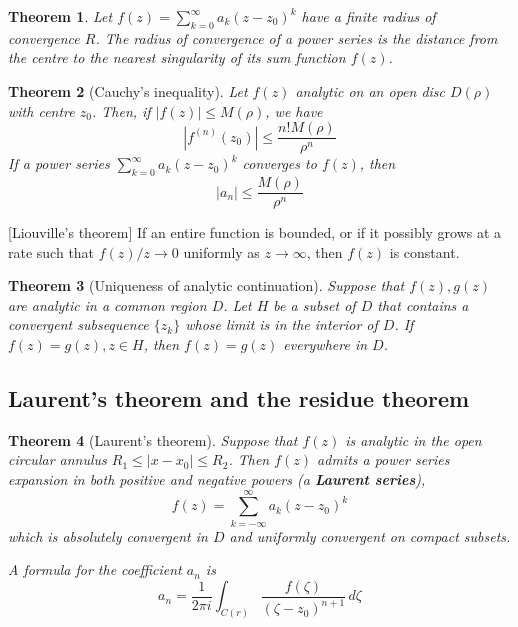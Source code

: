 \documentclass[10pt, oneside, reqno]{amsart}
\theoremstyle{plain}%
\newtheorem{thm}{Theorem}[section]
\theoremstyle{definition}
\theoremstyle{remark}
\begin{document}
\begin{thm}
    Let $f(z) = \sum_{k=0}^\infty a_k (z-z_0)^k$ have a finite radius of convergence $R$.  The radius of convergence of a power series is the distance from the centre to the nearest singularity of its sum function $f(z)$.  
\end{thm}

\begin{thm}[Cauchy's inequality]
    Let $f(z)$ analytic on an open disc $D(\rho)$ with centre $z_0$.  Then, if $|f(z)| \leq M(\rho)$, we have \[
        \left|f^{(n)}(z_0) \right| \leq \frac{n! M(\rho)}{\rho^n}
    \]
    If a power series $\sum_{k=0}^\infty a_k (z-z_0)^k$ converges to $f(z)$, then \[
        |a_n| \leq \frac{M(\rho)}{\rho^n}
    \]
\end{thm}[Liouville's theorem]
If an entire function is bounded, or if it possibly grows at a rate such that $f(z)/z \rightarrow 0$ uniformly as $z \rightarrow \infty$, then $f(z)$ is constant.

\begin{thm}[Uniqueness of analytic continuation]
    Suppose that $f(z), g(z)$ are analytic in a common region $D$.  Let $H$ be a subset of $D$ that contains a convergent subsequence $\{z_k \}$ whose limit is in the interior of $D$.  If $f(z) = g(z), z \in H$, then $f(z) = g(z)$ everywhere in $D$.  
\end{thm}




\subsection{Laurent's theorem and the residue theorem} %
\label{sec:laurent_s_theorem_and_the_residue_theorem}


\begin{thm}[Laurent's theorem]
    Suppose that $f(z)$ is analytic in the open circular annulus $R_1 \leq |x - x_0| \leq R_2$.  Then $f(z)$ admits a power series expansion in both positive and negative powers (a \textbf{Laurent series}), \[
        f(z) = \sum_{k=-\infty}^\infty a_k (z-z_0)^k
    \] which is absolutely convergent in $D$ and uniformly convergent on compact subsets.  
    
    A formula for the coefficient $a_n$ is \[
        a_n = \frac{1}{2\pi i} \int_{C(r)} \frac{f(\zeta)}{(\zeta - z_0)^{n+1}} \, d \zeta
    \]
\end{thm}
\end{document}

